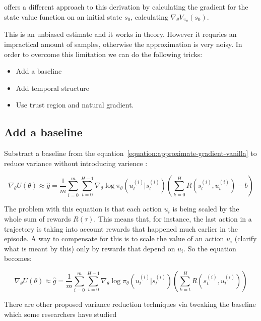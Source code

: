 \documentclass{../main.tex}{subfiles}
\begin{document}
\cite{Sutton1999} offers a different approach to this derivation by calculating the gradient for the state value function on an initial state $s_0$, calculating $\nabla_{\theta} V_{\pi_{\theta}}(s_0)$.

This is an unbiased estimate and it works in theory. However it requries an impractical amount of samples, otherwise the approximation is very noisy. In order to overcome this limitation we can do the following tricks:
\begin{itemize}
\item Add a baseline
\item Add temporal structure
\item Use trust region and natural gradient.
\end{itemize}

\subsection{Add a baseline}
Substract a baseline from the equation~\ref{equation:approximate-gradient-vanilla} to reduce variance without introducing varience \citep{ Williams1992}:

\begin{equation}\label{equation:approximate-gradient-vanilla}
\nabla_{\theta}U(\theta) \approx \hat{g} = \frac{1}{m} \sum_{i = 0}^{m} \sum_{t=0}^{H-1} \nabla_{\theta} \log \pi_{\theta}(u_t^{(i)} | s_t^{(i)}) (\sum_{k=0}^{H}R(s_t^{(i)}, u_t^{(i)}) - b)
\end{equation}

The problem with this equation is that each action $u_i$ is being scaled by the whole sum of rewards $R(\tau)$. This means that, for instance, the last action in a trajectory is taking into account rewards that happened much earlier in the episode. A way to compensate for this is to scale the value of an action $u_i$ (clarify what is meant by this) only by rewards that depend on $u_i$. So the equation becomes:

\begin{equation}
\nabla_{\theta}U(\theta) \approx \hat{g} = \frac{1}{m} \sum_{i = 0}^{m} \sum_{t=0}^{H-1} \nabla_{\theta} \log \pi_{\theta}(u_t^{(i)} | s_t^{(i)}) (\sum_{k=t}^{H}R(s_t^{(i)}, u_t^{(i)}))
\end{equation}

There are other proposed variance reduction techniques via tweaking the baseline which some researchers have studied~\citep{Greensmith2004}
\end{document}
